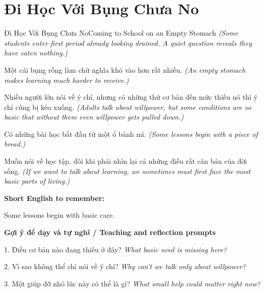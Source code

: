 \section{Đi Học Với Bụng Chưa No}
\begin{truyen}{Đi Học Với Bụng Chưa No}{Coming to School on an Empty Stomach}
\textit{(Some students enter first period already looking drained. A quiet question reveals they have eaten nothing.)}

Một cái bụng rỗng làm chữ nghĩa khó vào hơn rất nhiều.
\textit{(An empty stomach makes learning much harder to receive.)}

Nhiều người lớn nói về ý chí, nhưng có những thứ cơ bản đến mức thiếu nó thì ý chí cũng bị kéo xuống.
\textit{(Adults talk about willpower, but some conditions are so basic that without them even willpower gets pulled down.)}

Có những bài học bắt đầu từ một ổ bánh mì.
\textit{(Some lessons begin with a piece of bread.)}

\end{truyen}

\begin{baihoc}
Muốn nói về học tập, đôi khi phải nhìn lại cả những điều rất căn bản của đời sống.
\textit{(If we want to talk about learning, we sometimes must first face the most basic parts of living.)}
\end{baihoc}

\begin{ghinhoanh}
\textbf{Short English to remember:}

Some lessons begin with basic care.

\end{ghinhoanh}

\begin{tuhocnhanh}
\textbf{Gợi ý để dạy và tự nghĩ / Teaching and reflection prompts}

1. Điều cơ bản nào đang thiếu ở đây? \textit{What basic need is missing here?}

2. Vì sao không thể chỉ nói về ý chí? \textit{Why can’t we talk only about willpower?}

3. Một giúp đỡ nhỏ lúc này có thể là gì? \textit{What small help could matter right now?}
\end{tuhocnhanh}
\ngancach

